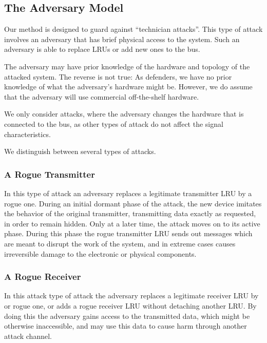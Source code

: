 \documentclass[conference]{IEEEtran}
\begin{document}
\subsection{The Adversary Model}
  Our method is designed to guard against ``technician attacks''. This type of attack involves an adversary that has brief physical access to the system. Such an adversary is able to replace LRUs or add new ones to the bus.
  
  The adversary may have prior knowledge of the hardware and topology of the attacked system. The reverse is not true: As defenders, we have no prior knowledge of what the adversary's hardware might be. However, we do assume that the adversary will use commercial off-the-shelf hardware.
  
  We only consider attacks, where the adversary changes the hardware that is connected to the bus, as other types of attack do not affect the signal characteristics.
  
  We distinguish between several types of attacks.

\subsubsection{A Rogue Transmitter}
  In this type of attack an adversary replaces a legitimate transmitter LRU by a rogue one. During an initial dormant phase of the attack, the new device imitates the behavior of the original transmitter, transmitting data exactly as requested, in order to remain hidden. Only at a later time, the attack moves on to its active phase. During this phase the rogue transmitter LRU sends out messages which are meant to disrupt the work of the system, and in extreme cases causes irreversible damage to the electronic or physical components.
  

\subsubsection{A Rogue Receiver}
  In this attack type of attack the adversary replaces a legitimate receiver LRU by or rogue one, or adds a rogue receiver LRU without detaching another LRU. By doing this the adversary gains access to the transmitted data, which might be otherwise inaccessible, and may use this data to cause harm through another attack channel.
\end{document}
